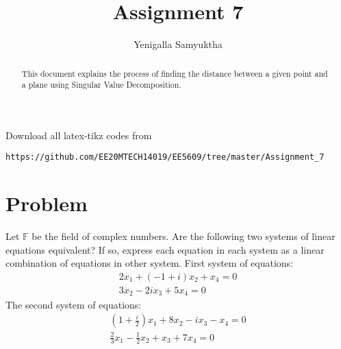 \documentclass[journal,12pt,twocolumn]{IEEEtran}
\begin{document}
     \def\rightbox#1{\makebox[0in][r]{#1}}
     \def\centbox#1{\makebox[0in]{#1}}
     \def\topbox#1{\raisebox{-\baselineskip}[0in][0in]{#1}}
     \def\midbox#1{\raisebox{-0.5\baselineskip}[0in][0in]{#1}}
\vspace{3cm}
\title{Assignment 7}
\author{Yenigalla Samyuktha}
\maketitle
\newpage
\bigskip
\renewcommand{\thefigure}{\theenumi}
\renewcommand{\thetable}{\theenumi}
\begin{abstract}
This document explains the process of finding the distance between a given point and a plane using Singular Value Decomposition.
\end{abstract}
Download all latex-tikz codes from 
%
\begin{lstlisting}
https://github.com/EE20MTECH14019/EE5609/tree/master/Assignment_7
\end{lstlisting}
%
\section{Problem}
Let $\mathbb{F}$  be the field of complex numbers. Are the following two systems of linear equations equivalent? If so, express each equation in each system as a linear combination of equations in other system. First system of equations:
\begin{align}
2x_1+(-1+i)x_2+x_4=0\\
3x_2-2ix_3+5x_4=0
\end{align}
The second system of equations:
\begin{align}
(1+\frac{i}{2})x_1+8x_2-ix_3-x_4=0\\
\frac{2}{3}x_1-\frac{1}{2}x_2+x_3+7x_4=0
\end{align}
\end{document}
